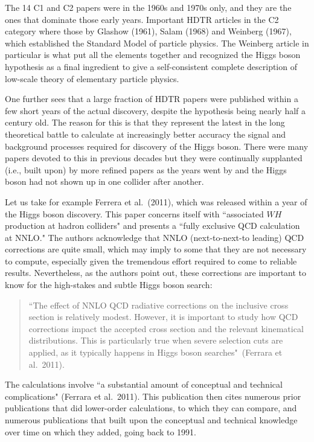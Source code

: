 \documentclass[letter,12pt]{article}
\begin{document}
The 14 C1 and C2 papers were in the 1960s and 1970s only, and they are the ones that dominate those early years. Important HDTR articles  in the C2 category where those by Glashow (1961), Salam (1968) and Weinberg (1967), which established the Standard Model of particle physics. The Weinberg article in particular is what put all the elements together and recognized the Higgs boson hypothesis as a final ingredient to give a self-consistent complete description of low-scale theory of elementary particle physics.

One further sees that a large fraction of HDTR papers were published within a few short years of the actual discovery, despite the hypothesis being nearly half a century old. The reason for this is that they represent the latest in the  long theoretical battle to calculate at increasingly better accuracy the signal and background processes required for discovery of the Higgs boson. There were many papers devoted to this in previous decades but they were continually supplanted (i.e., built upon) by more refined papers as the years went by and the Higgs boson had not shown up in one collider after another.  

Let us take for example Ferrera et al.\ (2011), which was released within a year of the Higgs boson discovery. This paper concerns itself with ``associated $WH$ production at hadron colliders" and presents a ``fully exclusive QCD calculation at NNLO."  The authors acknowledge that NNLO (next-to-next-to leading) QCD corrections are quite small, which may imply to some that they are not necessary to compute, especially given the tremendous effort required to come to reliable results. Nevertheless, as the authors point out, these corrections are important to know for the high-stakes and subtle Higgs boson search:
\begin{quote}
``The effect of NNLO QCD radiative corrections on the inclusive cross section is relatively
modest. However, it is important to study how QCD corrections impact the accepted cross
section and the relevant kinematical distributions. This is particularly true when severe selection
cuts are applied, as it typically happens in Higgs boson searches"~(Ferrara et al.\ 2011).
\end{quote}
The calculations involve ``a substantial amount of conceptual and technical complications" (Ferrara et al.\ 2011). This publication then cites numerous prior publications that did lower-order calculations, to which they can compare, and numerous publications that built upon the conceptual and technical knowledge over time on which they added, going back to 1991.
\end{document}
